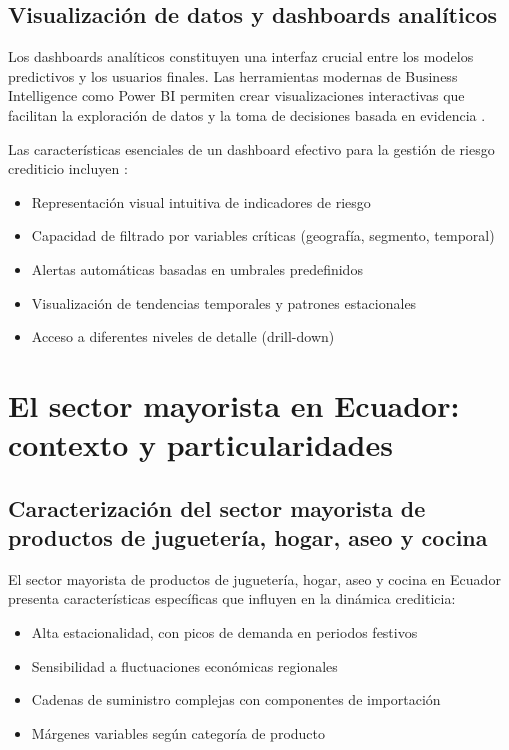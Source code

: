 \subsection{Visualización de datos y dashboards analíticos}
Los dashboards analíticos constituyen una interfaz crucial entre los modelos predictivos y los usuarios finales. Las herramientas modernas de Business Intelligence como Power BI permiten crear visualizaciones interactivas que facilitan la exploración de datos y la toma de decisiones basada en evidencia \citep{ferrari2020analyzing}.

Las características esenciales de un dashboard efectivo para la gestión de riesgo crediticio incluyen \citep{kirk2016data}:

\begin{itemize}
    \item Representación visual intuitiva de indicadores de riesgo
    \item Capacidad de filtrado por variables críticas (geografía, segmento, temporal)
    \item Alertas automáticas basadas en umbrales predefinidos
    \item Visualización de tendencias temporales y patrones estacionales
    \item Acceso a diferentes niveles de detalle (drill-down)
\end{itemize}

\section{El sector mayorista en Ecuador: contexto y particularidades}
\subsection{Caracterización del sector mayorista de productos de juguetería, hogar, aseo y cocina}
El sector mayorista de productos de juguetería, hogar, aseo y cocina en Ecuador presenta características específicas que influyen en la dinámica crediticia:

\begin{itemize}
    \item Alta estacionalidad, con picos de demanda en periodos festivos
    \item Sensibilidad a fluctuaciones económicas regionales
    \item Cadenas de suministro complejas con componentes de importación
    \item Márgenes variables según categoría de producto
\end{itemize}

